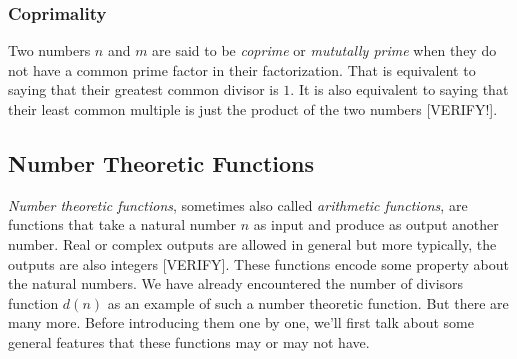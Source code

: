 %
%




\subsubsection{Coprimality}
Two numbers $n$ and $m$ are said to be \emph{coprime} or \emph{mututally prime} when they do not have a common prime factor in their factorization. That is equivalent to saying that their greatest common divisor is $1$. It is also equivalent to saying that their least common multiple is just the product of the two numbers [VERIFY!].


\subsection{Number Theoretic Functions}
\emph{Number theoretic functions}, sometimes also called \emph{arithmetic functions}, are functions that take a natural number $n$ as input and produce as output another number. Real or complex outputs are allowed in general but more typically, the outputs are also integers [VERIFY]. These functions encode some property about the natural numbers. We have already encountered the number of divisors function $d(n)$ as an example of such a number theoretic function. But there are many more. Before introducing them one by one, we'll first talk about some general features that these functions may or may not have.

